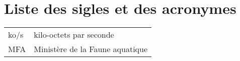 
%
%


\chapter{Liste des sigles et des acronymes}


\begin{flushleft}
   \begin{tabular}{@{}ll}
		ko/s		& kilo-octets par seconde							\\
		MFA			& Ministère de la Faune aquatique					\\
   \end{tabular}
\end{flushleft}
